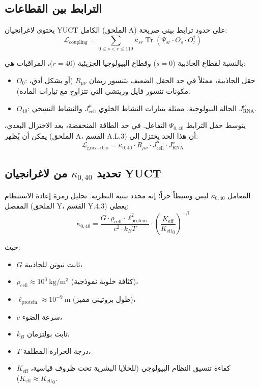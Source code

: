 \documentclass[11pt,a4paper]{article}
\newcommand{\Keff}{K_{\mathrm{eff}}}
\theoremstyle{remark}
\begin{document}
	\subsection{الترابط بين القطاعات}
	
	يحتوي لاغرانجيان YUCT الكامل (الملحق A) على حدود ترابط بيني صريحة:
	\begin{equation}
		\mathcal{L}_{\text{coupling}} = \sum_{0 \le s < r \le 119} \kappa_{sr} \operatorname{Tr}(\Psi_{sr} \cdot O_s \cdot O_r^\dagger)
		\label{eq:full-coupling}
	\end{equation}
	
	بالنسبة لقطاع الجاذبية (\(s=0\)) وقطاع البيولوجيا الجزيئية (\(r=40\))، المراقبات هي:
	\begin{itemize}
		\item \(O_0\): حقل الجاذبية، ممثلاً في حد الحقل الضعيف بتنسور ريمان \(R_{\mu\nu}\) (أو بشكل أدق، مكونات تنسور فايل وريتشي التي تتزاوج مع تيارات المادة).
		\item \(O_{40}\): الحالة البيولوجية، ممثلة بتيارات النشاط الخلوي \(J_{\text{cell}}^\mu\) والنشاط النسخي \(J_{\text{RNA}}^\nu\).
	\end{itemize}
	
	يتوسط حقل الترابط \(\Psi_{0,40}\) التفاعل. في حد الطاقة المنخفضة، بعد الاختزال البعدي، يمكن أن يُظهر (الملحق A، القسم A.L.3) أن هذا الحد يختزل إلى:
	\begin{equation}
		\mathcal{L}_{\text{grav}\to\text{bio}} = \kappa_{0,40} \cdot R_{\mu\nu} \cdot J_{\text{cell}}^\mu \cdot J_{\text{RNA}}^\nu
		\label{eq:coupling-raw}
	\end{equation}
	
	\subsection{تحديد \(\kappa_{0,40}\) من لاغرانجيان YUCT}
	
	المعامل \(\kappa_{0,40}\) ليس وسيطاً حراً؛ إنه محدد ببنية النظرية. تحليل زمرة إعادة الاستنظام المفصل (الملحق Y، القسم Y.4.3) يعطي:
	\begin{equation}
		\kappa_{0,40} = \frac{G \cdot \rho_{\text{cell}} \cdot \ell_{\text{protein}}^2}{c^2 \cdot k_B T} \cdot \left( \frac{\Keff}{{\Keff}_0} \right)^{-\beta}
		\label{eq:kappa-exact}
	\end{equation}
	
	حيث:
	\begin{itemize}
		\item \(G\) ثابت نيوتن للجاذبية،
		\item \(\rho_{\text{cell}} \approx 10^3\ \mathrm{kg/m^3}\) (كثافة خلوية نموذجية)،
		\item \(\ell_{\text{protein}} \approx 10^{-9}\ \mathrm{m}\) (طول بروتيني مميز)،
		\item \(c\) سرعة الضوء،
		\item \(k_B\) ثابت بولتزمان،
		\item \(T\) درجة الحرارة المطلقة،
		\item \(\Keff\) كفاءة تنسيق النظام البيولوجي (للخلايا البشرية تحت ظروف قياسية، \(\Keff \approx {\Keff}_0\)).
	\end{itemize}
	
\end{document}
